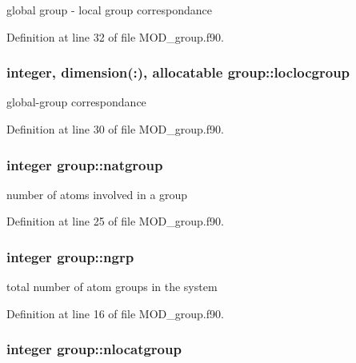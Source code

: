 global group -\/ local group correspondance 



Definition at line 32 of file M\-O\-D\-\_\-group.\-f90.

\hypertarget{classgroup_a175e13a44968b14d1359994c23165371}{
\subsubsection[{loclocgroup}]{\setlength{\rightskip}{0pt plus 5cm}integer, dimension(\-:), allocatable group\-::loclocgroup}}\label{classgroup_a175e13a44968b14d1359994c23165371}


global-\/group correspondance 



Definition at line 30 of file M\-O\-D\-\_\-group.\-f90.

\hypertarget{classgroup_ae394ac41a0b82e71ce39385f4e864fab}{
\subsubsection[{natgroup}]{\setlength{\rightskip}{0pt plus 5cm}integer group\-::natgroup}}\label{classgroup_ae394ac41a0b82e71ce39385f4e864fab}


number of atoms involved in a group 



Definition at line 25 of file M\-O\-D\-\_\-group.\-f90.

\hypertarget{classgroup_a00f7ad6b69b8e16f0338402c11bce2ad}{
\subsubsection[{ngrp}]{\setlength{\rightskip}{0pt plus 5cm}integer group\-::ngrp}}\label{classgroup_a00f7ad6b69b8e16f0338402c11bce2ad}


total number of atom groups in the system 



Definition at line 16 of file M\-O\-D\-\_\-group.\-f90.

\hypertarget{classgroup_a3f062dde36b7ccc9f1b0d92cf9a9eff0}{
\subsubsection[{nlocatgroup}]{\setlength{\rightskip}{0pt plus 5cm}integer group\-::nlocatgroup}}\label{classgroup_a3f062dde36b7ccc9f1b0d92cf9a9eff0}


